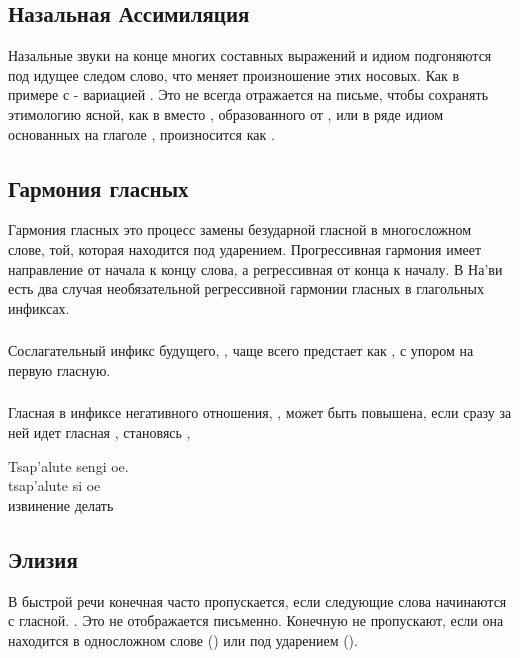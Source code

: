 \subsection{Назальная Ассимиляция} Назальные звуки на конце многих составных выражений и идиом подгоняются под идущее следом слово, что меняет произношение этих носовых. Как в примере с  - вариацией .  Это не всегда отражается на письме, чтобы сохранять этимологию ясной, как в  вместо , образованного от , или в ряде идиом основанных на глаголе  ,  произносится как
.  \label{l-and-s:nasalassim}

\subsection{Гармония гласных} Гармония гласных это процесс замены безударной гласной в многосложном слове, той, которая находится под ударением.
Прогрессивная гармония имеет направление от начала к концу слова, а регрессивная от конца к началу.
В На'ви есть два случая необязательной регрессивной гармонии гласных в глагольных инфиксах.

\subsubsection{} Сослагательный инфикс будущего, , чаще всего предстает как , с упором на первую гласную.

\subsubsection{}\label{l-and-s:eng}
Гласная в инфиксе негативного отношения, , может быть повышена, если сразу за ней идет гласная , становясь ,

\begin{interlin}
\glll Tsap'alute sengi oe. \\
      tsap'alute si oe \\
      извинение делать  \\
\end{interlin}


\subsection{Элизия} В быстрой речи конечная  часто пропускается, если следующие слова начинаются с гласной.  . Это не отображается письменно.
Конечную  не пропускают, если она находится в односложном слове () или под ударением ().

